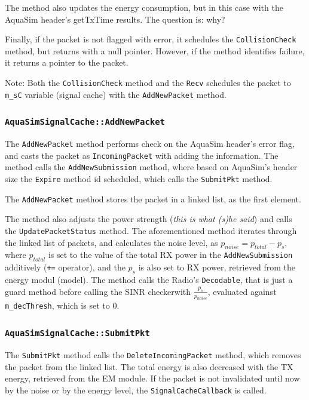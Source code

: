 \documentclass[a4paper]{article}
\begin{document}
The method also updates the energy consumption, but in this case with the AquaSim header's getTxTime results. The question is: why?

Finally, if the packet is not flagged with error, it schedules the \texttt{CollisionCheck} method, but returns with a null pointer. However, if the method identifies failure, it returns a pointer to the packet.

Note: Both the \texttt{CollisionCheck} method and the \texttt{Recv} schedules the packet to \texttt{m\_sC} variable (signal cache) with the \texttt{AddNewPacket} method.

\subsubsection{\texttt{AquaSimSignalCache::AddNewPacket}}
The \texttt{AddNewPacket} method performs check on the AquaSim header's error flag, and casts the packet as \texttt{IncomingPacket} with adding the information. The method calls the \texttt{AddNewSubmission} method, where based on AquaSim's header size the \texttt{Expire} method id scheduled, which calls the \texttt{SubmitPkt} method.

The \texttt{AddNewPacket} method stores the packet in a linked list, as the first element.

The method also adjusts the power strength (\textit{this is what (s)he said}) and calls the \texttt{UpdatePacketStatus} method. The aforementioned method iterates through the linked list of packets, and calculates the noise level, as $p_{noise} = p_{total} - p_{s}$, where $p_{total}$ is set to the value of the total RX power in the \texttt{AddNewSubmission} additively (\texttt{+=} operator), and the $p_{s}$ is also set to RX power, retrieved from the energy modul (model). The method calls the Radio's \texttt{Decodable}, that is just a guard method before calling the SINR checkerwith $\frac{p_{s}}{p_{noise}}$, evaluated against \texttt{m\_decThresh}, which is set to $0$.

\subsubsection{\texttt{AquaSimSignalCache::SubmitPkt}}
The \texttt{SubmitPkt} method calls the \texttt{DeleteIncomingPacket} method, which removes the packet from the linked list. The total energy is also decreased with the TX energy, retrieved from the EM module. If the packet is not invalidated until now by the noise or by the energy level, the \texttt{SignalCacheCallback} is called.
\end{document}

